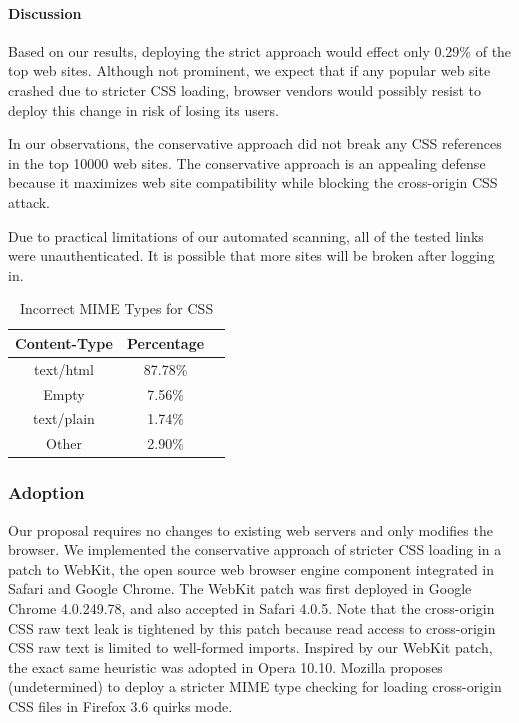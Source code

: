 \documentclass{acm_proc_article-sp}
\begin{document}
{\paragraph{Discussion}
Based on our results, deploying the strict approach would effect only 0.29\% of the top web sites. Although not prominent, we expect that if any popular web site crashed due to stricter CSS loading, browser vendors would possibly resist to deploy this change in risk of losing its users.

In our observations, the conservative approach did not break any CSS references in the top 10000 web sites. The conservative approach is an appealing defense because it maximizes web site compatibility while blocking the cross-origin CSS attack.

Due to practical limitations of our automated scanning, all of the tested links were unauthenticated. It is possible that more sites will be broken after logging in.

\begin{table}
\centering
\caption{Incorrect MIME Types for CSS}
\begin{tabular}{|c|c|c|} \hline
Content-Type&Percentage\\ \hline
text/html&87.78\%\\ \hline
Empty&7.56\%\\ \hline
text/plain&1.74\%\\ \hline
Other&2.90\%\\
\hline\end{tabular}
\end{table}


\subsubsection{Adoption}
Our proposal requires no changes to existing web servers and only modifies the browser. We implemented the conservative approach of stricter CSS loading in a patch to WebKit, the open source web browser engine component integrated in Safari and Google Chrome. The WebKit patch was first deployed in Google Chrome 4.0.249.78, and also accepted in Safari 4.0.5. Note that the cross-origin CSS raw text leak is tightened by this patch because read access to cross-origin CSS raw text is limited to well-formed imports. Inspired by our WebKit patch, the exact same heuristic was adopted in Opera 10.10. Mozilla proposes (undetermined) to deploy a stricter MIME type checking for loading cross-origin CSS files in Firefox 3.6 quirks mode.

}
\end{document}

